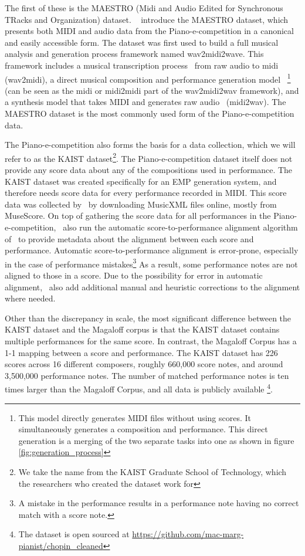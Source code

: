 The first of these is the MAESTRO (Midi and Audio Edited for Synchronous TRacks and Organization) dataset. ~\citet{hawthorne2018enabling} introduce the MAESTRO dataset, which presents both MIDI and audio data from the Piano-e-competition in a canonical and easily accessible form. The dataset was first used to build a full musical analysis and generation process framework named wav2midi2wave. This framework includes a musical transcription process~\cite{hawthorne2017onsets} from raw audio to midi (wav2midi), a direct musical composition and performance generation model~\cite{huang2018music} \footnote{This model directly generates MIDI files without using scores. It simultaneously generates a composition and performance. This direct generation is a merging of the two separate tasks into one as shown in figure \ref{fig:generation_process}} (can be seen as the midi or midi2midi part of the wav2midi2wav framework), and a synthesis model that takes MIDI and generates raw audio~\cite{oord2016wavenet} (midi2wav). The MAESTRO dataset is the most commonly used form of the Piano-e-competition data. 

The Piano-e-competition also forms the basis for a data collection, which we will refer to as the KAIST dataset\footnote{We take the name from the KAIST Graduate School of Technology, which the researchers who created the dataset work for}. The Piano-e-competition dataset itself does not provide any score data about any of the compositions used in performance. The KAIST dataset was created specifically for an EMP generation system, and therefore needs score data for every performance recorded in MIDI. This score data was collected by~\citet{jeong2019virtuosonet} by downloading MusicXML files online, mostly from MuseScore. On top of gathering the score data for all performances in the Piano-e-competition,~\citet{jeong2019virtuosonet} also run the automatic score-to-performance alignment algorithm of~\citet{nakamura2017performance} to provide metadata about the alignment between each score and performance. Automatic score-to-performance alignment is error-prone, especially in the case of performance mistakes\footnote{A mistake in the performance results in a performance note having no correct match with a score note.} As a result, some performance notes are not aligned to those in a score. Due to the possibility for error in automatic alignment,~\citet{jeong2019virtuosonet} also add additional manual and heuristic corrections to the alignment where needed. 

Other than the discrepancy in scale, the most significant difference between the KAIST dataset and the Magaloff corpus is that the KAIST dataset contains multiple performances for the same score. In contrast, the Magaloff Corpus has a 1-1 mapping between a score and performance. The KAIST dataset has 226 scores across 16 different composers, roughly 660,000 score notes, and around 3,500,000 performance notes. The number of matched performance notes is ten times larger than the Magaloff Corpus, and all data is publicly available \footnote{The dataset is open sourced at \url{https://github.com/mac-marg-pianist/chopin_cleaned}}. 

